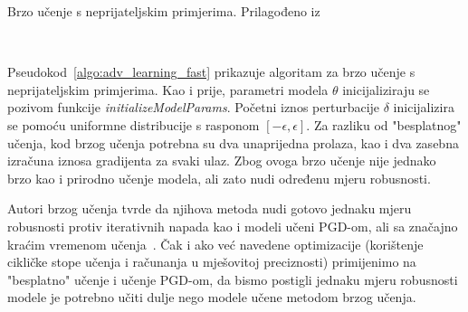 \documentclass[times, utf8, zavrsni, numeric]{fer}
\newcommand{\pluseq}{\mathrel{+}=}
\begin{document}
\pagebreak

\begin{algorithm}
    \caption{Brzo učenje s neprijateljskim primjerima. Prilagođeno iz~\cite{wong2020fast}}
    \label{algo:adv_learning_fast}
    \begin{algorithmic}
        \\\hrulefill
                \STATE{$grad \pluseq \nabla_{\theta}L(x_{i} + \delta,y_{i};\theta)$}
            \ENDFOR
        \ENDFOR
    \end{algorithmic}
\end{algorithm}

Pseudokod~\ref{algo:adv_learning_fast} prikazuje algoritam za brzo učenje s neprijateljskim primjerima.
Kao i prije, parametri modela $\theta$ inicijaliziraju se pozivom funkcije \textit{initializeModelParams}.
Početni iznos perturbacije $\delta$ inicijalizira se pomoću uniformne distribucije s rasponom $[-\epsilon, \epsilon]$.
Za razliku od "besplatnog" učenja, kod brzog učenja potrebna su dva unaprijedna prolaza, kao i dva zasebna izračuna iznosa gradijenta za svaki ulaz.
Zbog ovoga brzo učenje nije jednako brzo kao i prirodno učenje modela, ali zato nudi određenu mjeru robusnosti.

Autori brzog učenja tvrde da njihova metoda nudi gotovo jednaku mjeru robusnosti protiv iterativnih napada kao i modeli učeni PGD-om, 
ali sa značajno kraćim vremenom učenja~\cite{wong2020fast}. Čak i ako već navedene optimizacije (korištenje cikličke stope učenja i računanja u mješovitoj preciznosti) primijenimo na "besplatno" učenje i učenje PGD-om, 
da bismo postigli jednaku mjeru robusnosti modele je potrebno učiti dulje nego modele učene metodom brzog učenja.

\pagebreak
\end{document}
